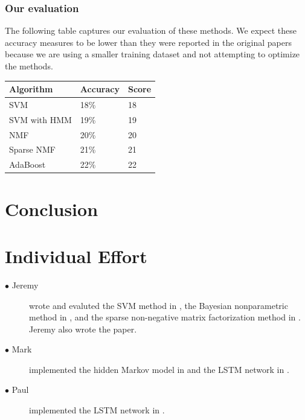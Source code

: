 \documentclass[5p]{elsarticle}
\begin{document}
\subsubsection{Our evaluation}

The following table captures our evaluation of these methods. We expect these accuracy measures to be lower than they were reported in the original papers because we are using a smaller training dataset and not attempting to optimize the methods.

\begin{center}
\begin{tabular}{|l|l|l|}
\hline
Algorithm & Accuracy & Score \\ \hline
SVM & 18\% & 18 \\ \hline
SVM with HMM & 19\% & 19 \\ \hline
NMF & 20\% & 20 \\ \hline
Sparse NMF & 21\% & 21 \\ \hline
AdaBoost & 22\% & 22 \\ \hline
\end{tabular}
\end{center}

\section{Conclusion}





\section{Individual Effort}
\begin{description}
\item[$\bullet$ Jeremy] wrote and evaluted the SVM method in \citet{poliner2006discriminative}, the Bayesian nonparametric method in \citet{blei2010bayesian}, and the sparse non-negative matrix factorization method in \citet{abdallah2004polyphonic}. Jeremy also wrote the paper.
\item[$\bullet$ Mark] implemented the hidden Markov model in \citet{poliner2006discriminative} and the LSTM network in \citet{bock2012polyphonic}.
\item[$\bullet$ Paul] implemented the LSTM network in \citet{bock2012polyphonic}.
\end{description}
\end{document}
